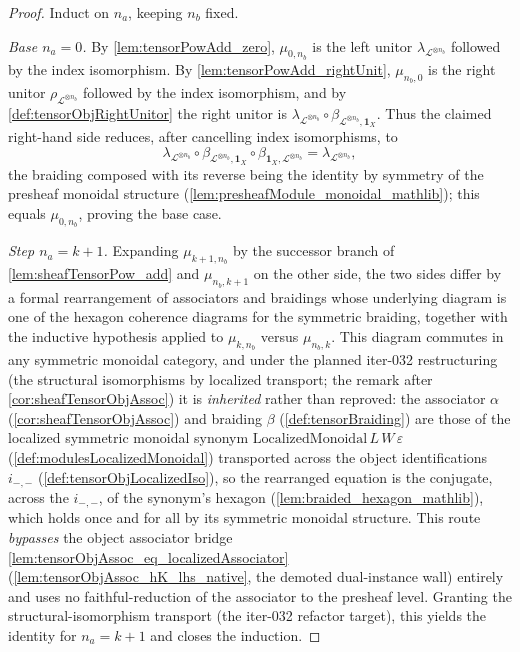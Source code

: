 \begin{proof}
  Induct on \(n_a\), keeping \(n_b\) fixed.

  \emph{Base \(n_a = 0\).} By \cref{lem:tensorPowAdd_zero}, \(\mu_{0,n_b}\) is the
  left unitor \(\lambda_{\mathcal{L}^{\otimes n_b}}\) followed by the index
  isomorphism. By \cref{lem:tensorPowAdd_rightUnit}, \(\mu_{n_b,0}\) is the right
  unitor \(\rho_{\mathcal{L}^{\otimes n_b}}\) followed by the index isomorphism, and
  by \cref{def:tensorObjRightUnitor} the right unitor is
  \(\lambda_{\mathcal{L}^{\otimes n_b}} \circ
  \beta_{\mathcal{L}^{\otimes n_b},\mathbf{1}_X}\). Thus the claimed right-hand
  side reduces, after cancelling index isomorphisms, to
  \[
    \lambda_{\mathcal{L}^{\otimes n_b}}
      \circ \beta_{\mathcal{L}^{\otimes n_b},\mathbf{1}_X}
      \circ \beta_{\mathbf{1}_X,\mathcal{L}^{\otimes n_b}}
      = \lambda_{\mathcal{L}^{\otimes n_b}},
  \]
  the braiding composed with its reverse being the identity by symmetry of the
  presheaf monoidal structure (\cref{lem:presheafModule_monoidal_mathlib}); this
  equals \(\mu_{0,n_b}\), proving the base case.

  \emph{Step \(n_a = k+1\).} Expanding \(\mu_{k+1,n_b}\) by the successor branch of
  \cref{lem:sheafTensorPow_add} and \(\mu_{n_b,k+1}\) on the other side, the two
  sides differ by a formal rearrangement of associators and braidings whose
  underlying diagram is one of the hexagon coherence diagrams for the symmetric
  braiding, together with the inductive hypothesis applied to \(\mu_{k,n_b}\)
  versus \(\mu_{n_b,k}\). This diagram commutes in any symmetric monoidal category,
  and under the planned iter-032 restructuring (the structural isomorphisms by
  localized transport; the remark after \cref{cor:sheafTensorObjAssoc}) it is
  \emph{inherited} rather than reproved: the associator \(\alpha\)
  (\cref{cor:sheafTensorObjAssoc}) and braiding \(\beta\)
  (\cref{def:tensorBraiding}) are those of the localized symmetric monoidal synonym
  \(\mathrm{LocalizedMonoidal}\,L\,W\,\varepsilon\)
  (\cref{def:modulesLocalizedMonoidal}) transported across the object
  identifications \(i_{-,-}\) (\cref{def:tensorObjLocalizedIso}), so the rearranged
  equation is the conjugate, across the \(i_{-,-}\), of the synonym's hexagon
  (\cref{lem:braided_hexagon_mathlib}), which holds once and for all by its
  symmetric monoidal structure. This route \emph{bypasses} the object associator
  bridge \cref{lem:tensorObjAssoc_eq_localizedAssociator}
  (\cref{lem:tensorObjAssoc_hK_lhs_native}, the demoted dual-instance wall)
  entirely and uses no faithful-reduction of the associator to the presheaf level.
  Granting the structural-isomorphism transport (the iter-032 refactor target),
  this yields the identity for \(n_a = k+1\) and closes the induction.


\end{proof}
